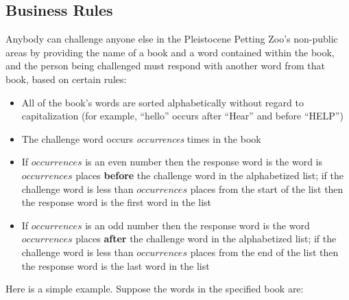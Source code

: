 \subsection{Business Rules} \label{subsec:BusinessRules}


Anybody can challenge anyone else in the Pleistocene Petting Zoo's non-public areas by providing the name of a book and a word contained within the book, and the person being challenged must respond with another word from that book, based on certain rules:
\begin{itemize}
    \item All of the book's words are sorted alphabetically without regard to capitalization (for example, ``hello'' occurs after ``Hear'' and before ``HELP'')
    \item The challenge word occurs \textit{occurrences} times in the book
    \item If $occurrences$ is an even number then the response word is the word is $occurrences$ places \textbf{before} the challenge word in the alphabetized list;
    if the challenge word is less than $occurrences$ places from the start of the list then the response word is the first word in the list
    \item If $occurrences$ is an odd number then the response word is the word $occurrences$ places \textbf{after} the challenge word in the alphabetized list;
    if the challenge word is less than $occurrences$ places from the end of the list then the response word is the last word in the list
\end{itemize}

Here is a simple example.
Suppose the words in the specified book are:


